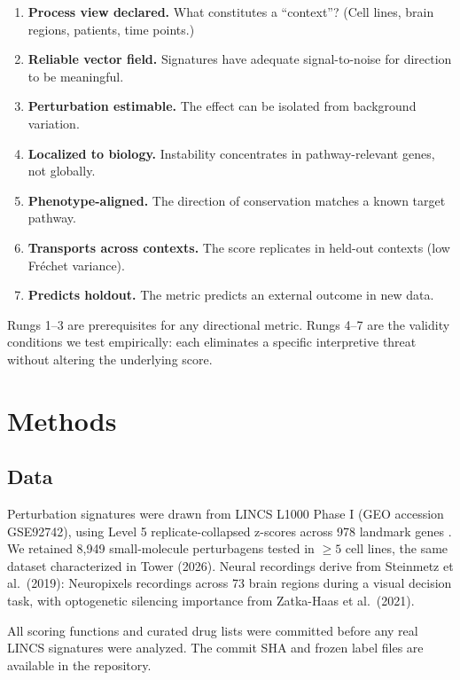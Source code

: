 \documentclass{article}
\begin{document}
\begin{enumerate}
  \item \textbf{Process view declared.} What constitutes a ``context''?
    (Cell lines, brain regions, patients, time points.)
  \item \textbf{Reliable vector field.} Signatures have adequate signal-to-noise
    for direction to be meaningful.
  \item \textbf{Perturbation estimable.} The effect can be isolated from
    background variation.
  \item \textbf{Localized to biology.} Instability concentrates in
    pathway-relevant genes, not globally.
  \item \textbf{Phenotype-aligned.} The direction of conservation matches a
    known target pathway.
  \item \textbf{Transports across contexts.} The score replicates in held-out
    contexts (low Fr\'echet variance).
  \item \textbf{Predicts holdout.} The metric predicts an external outcome
    in new data.
\end{enumerate}

Rungs 1--3 are prerequisites for any directional metric. Rungs 4--7 are the
validity conditions we test empirically: each eliminates a specific
interpretive threat without altering the underlying score.

\section{Methods}

\subsection{Data}

Perturbation signatures were drawn from LINCS L1000 Phase I (GEO accession
GSE92742), using Level 5 replicate-collapsed z-scores across 978 landmark
genes \citep{subramanian2017next}. We retained 8{,}949 small-molecule
perturbagens tested in $\geq5$ cell lines, the same dataset characterized in
Tower (2026). Neural recordings derive from Steinmetz et al.\ (2019):
Neuropixels recordings across 73 brain regions during a visual decision task,
with optogenetic silencing importance from Zatka-Haas et al.\ (2021).

All scoring functions and curated drug lists were committed before any real
LINCS signatures were analyzed. The commit SHA and frozen label files are
available in the repository.
\end{document}
